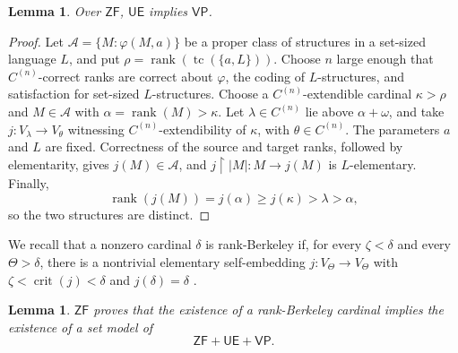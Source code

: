 \documentclass[11pt,a4paper]{amsart}
\newcommand{\VP}{\mathsf{VP}}
\newcommand{\ZF}{\mathsf{ZF}}
\newcommand{\tc}{\operatorname{tc}}
\newcommand{\rank}{\operatorname{rank}}
\newcommand{\restr}{\mathbin{\upharpoonright}}
\newcommand{\crit}{\operatorname{crit}}
\newcommand{\UE}{\mathsf{UE}}
\theoremstyle{plain}
\newtheorem{lemma}[theorem]{Lemma}
\theoremstyle{definition}
\theoremstyle{remark}
\begin{document}
\begin{lemma}\label{lem:OH-VP}
Over $\ZF$, $\UE$ implies $\VP$.
\end{lemma}

\begin{proof}
 Let $\mathcal A=\{M:\varphi(M,a)\}$ be a proper class of structures in a set-sized language $L$, and put $\rho=\rank(\tc(\{a,L\}))$.  Choose $n$ large enough that $C^{(n)}$-correct ranks are correct about $\varphi$, the coding of $L$-structures, and satisfaction for set-sized $L$-structures.  Choose a $C^{(n)}$-extendible cardinal $\kappa>\rho$ and $M\in\mathcal A$ with $\alpha=\rank(M)>\kappa$.  Let $\lambda\in C^{(n)}$ lie above $\alpha+\omega$, and take $j:V_\lambda\longrightarrow V_\theta$ witnessing $C^{(n)}$-extendibility of $\kappa$, with $\theta\in C^{(n)}$.  The parameters $a$ and $L$ are fixed.  Correctness of the source and target ranks, followed by elementarity, gives $j(M)\in\mathcal A$, and $j\restr|M|:M\to j(M)$ is $L$-elementary.  Finally,
\[
\rank(j(M))=j(\alpha)\geq j(\kappa)>\lambda>\alpha,
\]
so the two structures are distinct.
\end{proof}

We recall that a nonzero cardinal $\delta$ is rank-Berkeley if, for every $\zeta<\delta$ and every $\Theta>\delta$, there is a nontrivial elementary self-embedding $j:V_\Theta\to V_\Theta$ with $\zeta<\crit(j)<\delta$ and $j(\delta)=\delta$ \cite[Definition~4.4]{Mohammd}.

\begin{lemma}\label{lem:rank-Berkeley-descent}
$\ZF$ proves that the existence of a rank-Berkeley cardinal implies the existence of a set model of
\[
\ZF+\UE+\VP.
\]
\end{lemma}
\end{document}
